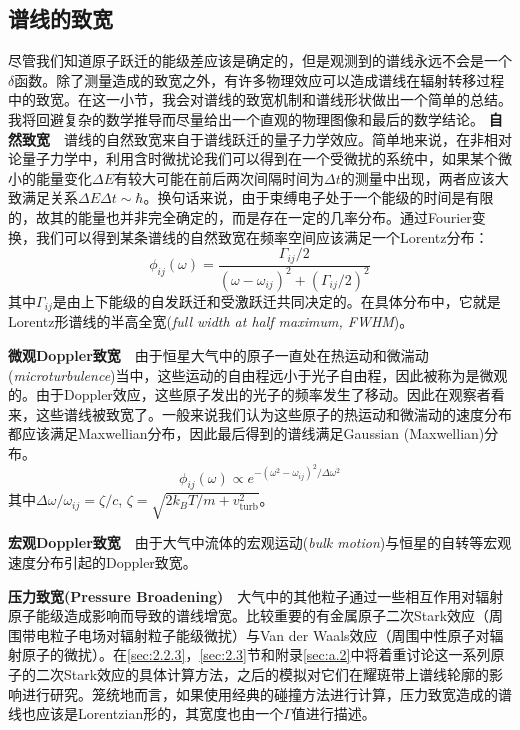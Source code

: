 \subsection{谱线的致宽}\label{sec:1.2.3}
尽管我们知道原子跃迁的能级差应该是确定的，但是观测到的谱线永远不会是一个$\delta$函数。除了测量造成的致宽之外，有许多物理效应可以造成谱线在辐射转移过程中的致宽。在这一小节，我会对谱线的致宽机制和谱线形状做出一个简单的总结。我将回避复杂的数学推导而尽量给出一个直观的物理图像和最后的数学结论。
\newline
\newline
\noindent
\textbf{自然致宽}\ \ 谱线的自然致宽来自于谱线跃迁的量子力学效应。简单地来说，在非相对论量子力学中，利用含时微扰论我们可以得到在一个受微扰的系统中，如果某个微小的能量变化$\Delta E$有较大可能在前后两次间隔时间为$\Delta t$的测量中出现，两者应该大致满足关系$\Delta E \Delta t \sim \hbar$。换句话来说，由于束缚电子处于一个能级的时间是有限的，故其的能量也并非完全确定的，而是存在一定的几率分布。通过Fourier变换，我们可以得到某条谱线的自然致宽在频率空间应该满足一个Lorentz分布：
\begin{equation}
	\phi_{ij}(\omega) = \frac{\Gamma_{ij}/2}{(\omega - \omega_{ij})^2 + (\Gamma_{ij}/2)^2}
\end{equation}
其中$\Gamma_{ij}$是由上下能级的自发跃迁和受激跃迁共同决定的。在具体分布中，它就是Lorentz形谱线的半高全宽(\textit{full width at half maximum, FWHM})。

\noindent
\textbf{微观Doppler致宽}\ \ 由于恒星大气中的原子一直处在热运动和微湍动(\textit{microturbulence})当中，这些运动的自由程远小于光子自由程，因此被称为是微观的。由于Doppler效应，这些原子发出的光子的频率发生了移动。因此在观察者看来，这些谱线被致宽了。一般来说我们认为这些原子的热运动和微湍动的速度分布都应该满足Maxwellian分布，因此最后得到的谱线满足Gaussian (Maxwellian)分布。
\begin{equation}
	\phi_{ij}(\omega) \propto e^{-(\omega^2-\omega_{ij})^2/\Delta \omega^2}
\end{equation}
其中$\Delta \omega/\omega_{ij} = \zeta/c $, $\zeta = \sqrt{2k_B T/m + v^2_{\mathrm{turb}}}$。

\noindent
\textbf{宏观Doppler致宽}\ \ 由于大气中流体的宏观运动(\textit{bulk motion})与恒星的自转等宏观速度分布引起的Doppler致宽。

\noindent
\textbf{压力致宽(Pressure Broadening)}\ \ 大气中的其他粒子通过一些相互作用对辐射原子能级造成影响而导致的谱线增宽。比较重要的有金属原子二次Stark效应（周围带电粒子电场对辐射粒子能级微扰）与Van der Waals效应（周围中性原子对辐射原子的微扰）。在\ref{sec:2.2.3}，\ref{sec:2.3}节和附录\ref{sec:a.2}中将着重讨论这一系列原子的二次Stark效应的具体计算方法，之后的模拟对它们在耀斑带上谱线轮廓的影响进行研究。笼统地而言，如果使用经典的碰撞方法进行计算，压力致宽造成的谱线也应该是Lorentzian形的，其宽度也由一个$\Gamma$值进行描述。

